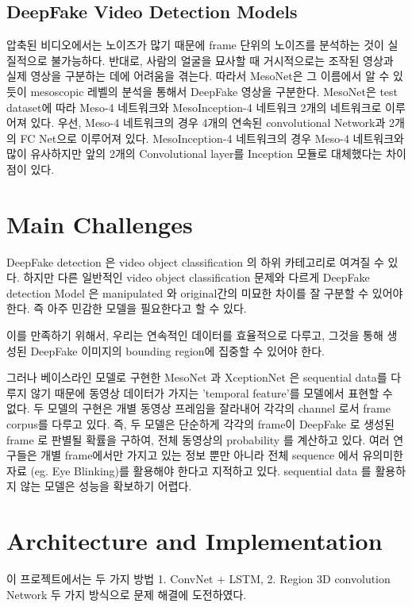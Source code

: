 \documentclass{article}
\begin{document}
		\subsection{DeepFake Video Detection Models}
		압축된 비디오에서는 노이즈가 많기 때문에 frame 단위의 노이즈를 분석하는 것이 실질적으로 불가능하다. 반대로, 사람의 얼굴을 묘사할 때 거시적으로는 조작된 영상과 실제 영상을 구분하는 데에 어려움을 겪는다. 따라서 MesoNet은 그 이름에서 알 수 있듯이 mesoscopic 레벨의 분석을 통해서 DeepFake 영상을 구분한다. MesoNet은 test dataset에 따라 Meso-4 네트워크와 MesoInception-4 네트워크 2개의 네트워크로 이루어져 있다. 우선, Meso-4 네트워크의 경우 4개의 연속된 convolutional Network과 2개의 FC Net으로 이루어져 있다. MesoInception-4 네트워크의 경우 Meso-4 네트워크와 많이 유사하지만 앞의 2개의 Convolutional layer를 Inception 모듈로 대체했다는 차이점이 있다.
	
	
	\section{Main Challenges}
	DeepFake detection 은 video object classification 의 하위 카테고리로 여겨질 수 있다. 하지만 다른 일반적인 video object classification  문제와 다르게 DeepFake detection Model 은 manipulated 와 original간의 미묘한 차이를 잘 구분할 수 있어야 한다. 즉 아주 민감한 모델을 필요한다고 할 수 있다. 

	이를 만족하기 위해서, 우리는 연속적인 데이터를 효율적으로 다루고, 그것을 통해 생성된 DeepFake 이미지의 bounding region에 집중할 수 있어야 한다.

	그러나 베이스라인 모델로 구현한 MesoNet 과 XceptionNet 은 sequential data를 다루지 않기 때문에 동영상 데이터가 가지는 'temporal feature'를 모델에서 표현할 수 없다. 두 모델의 구현은 개별 동영상 프레임을 잘라내어 각각의 channel 로서 frame corpus를 다루고 있다. 즉, 두 모델은 단순하게 각각의 frame이 DeepFake 로 생성된 frame 로 판별될 확률을 구하여, 전체 동영상의 probability 를 계산하고 있다. 여러 연구들은 개별 frame에서만 가지고 있는 정보 뿐만 아니라 전체 sequence 에서 유의미한 자료 (eg. Eye Blinking)를 활용해야 한다고 지적하고 있다. sequential data 를 활용하지 않는 모델은 성능을 확보하기 어렵다.
	
	\section{Architecture and Implementation}
	이 프로젝트에서는 두 가지 방법 1. ConvNet + LSTM, 2. Region 3D convolution Network 두 가지 방식으로 문제 해결에 도전하였다.
	
\end{document}

